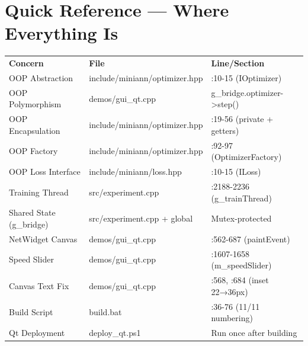 \documentclass[12pt]{article}
\begin{document}
\section{Quick Reference — Where Everything Is}
\begin{tabular}{lll}
\textbf{Concern} & \textbf{File} & \textbf{Line/Section} \\
OOP Abstraction & include/miniann/optimizer.hpp & :10-15 (IOptimizer) \\
OOP Polymorphism & demos/gui\_qt.cpp & g\_bridge.optimizer->step() \\
OOP Encapsulation & include/miniann/optimizer.hpp & :19-56 (private + getters) \\
OOP Factory & include/miniann/optimizer.hpp & :92-97 (OptimizerFactory) \\
OOP Loss Interface & include/miniann/loss.hpp & :10-15 (ILoss) \\
Training Thread & src/experiment.cpp & :2188-2236 (g\_trainThread) \\
Shared State (g\_bridge) & src/experiment.cpp + global & Mutex-protected \\
NetWidget Canvas & demos/gui\_qt.cpp & :562-687 (paintEvent) \\
Speed Slider & demos/gui\_qt.cpp & :1607-1658 (m\_speedSlider) \\
Canvas Text Fix & demos/gui\_qt.cpp & :568, :684 (inset 22→36px) \\
Build Script & build.bat & :36-76 (11/11 numbering) \\
Qt Deployment & deploy\_qt.ps1 & Run once after building \\
\end{tabular}
\end{document}
